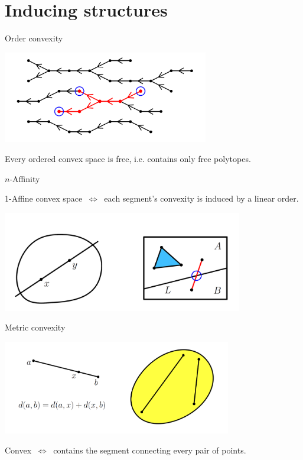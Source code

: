\documentclass[12pt]{beamer}
\begin{document}
\newpage



\section*{Inducing structures}

\begin{frame}{Order convexity}
    \centering

    \includegraphics[width = 9cm]{9.png}

    \begin{theorem}
        Every ordered convex space is free, i.e. contains only free polytopes.
    \end{theorem}
\end{frame}

\newpage

\begin{frame}{\(n\)-Affinity}
    \begin{definition}
        1-Affine convex space \(\ \Longleftrightarrow \ \) each segment's convexity is induced by a linear order.
    \end{definition}

    \centering

    \includegraphics[width = 10.5cm]{10.png}
\end{frame}

\newpage

\begin{frame}{Metric convexity}
    \centering

    \includegraphics[width = 10cm]{11.png}

    \begin{definition}
        Convex \(\ \Longleftrightarrow \ \) contains the segment connecting every pair of points.
    \end{definition}
\end{frame}
\end{document}
